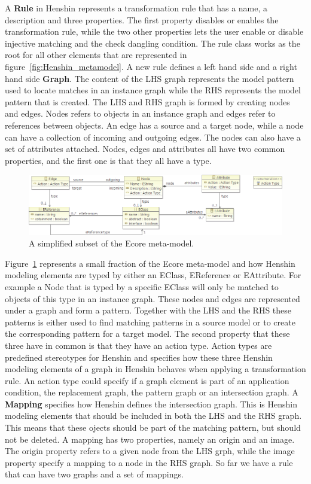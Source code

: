 A \textbf{Rule} in Henshin represents a transformation rule that has a name,
a description and three properties. The first property disables or enables the
transformation rule, while the two other properties lets the user enable or
disable injective matching and the check dangling condition. The rule class
works as the root for all other elements that are represented in 
figure~\ref{fig:Henshin_metamodel}. A new rule defines a left hand side and a
right hand side \textbf{Graph}. The content of the LHS graph represents the
model pattern used to locate matches in an instance graph while the RHS
represents the model pattern that is created. The LHS and RHS graph is formed by
creating nodes and edges. Nodes refers to objects in an instance graph and
edges refer to references between objects. An edge has a source and a target
node, while a node can have a collection of incoming and outgoing edges. The
nodes can also have a set of attributes attached. Nodes, edges and attributes
all have two common properties, and the first one is that they all have a type.

\begin{figure}[H]
	\centering
	\includegraphics[scale=0.60]{./Figures/Node_edge_attribute.png}
	\caption[Henshin relationship with Ecore]
	{A simplified subset of the Ecore meta-model.}
	\label{fig:henshin_ecore}
\end{figure}

Figure~\ref{fig:henshin_ecore} represents a small fraction of the Ecore
meta-model and how Henshin modeling elements are typed by either an EClass,
EReference or EAttribute. For example a Node that is typed by a specific EClass
will only be matched to objects of this type in an instance graph. These nodes
and edges are represented under a graph and form a pattern. Together with the
LHS and the RHS these patterns is either used to find matching patterns in a
source model or to create the corresponding pattern for a target model. The
second property that these three have in common is that they have an action
type. Action types are predefined stereotypes for Henshin and specifies how
these three Henshin modeling elements of a graph in Henshin behaves when
applying a transformation rule. An action type could specify if a graph element
is part of an application condition, the replacement graph, the pattern graph
or an intersection graph. A \textbf{Mapping} specifies how Henshin defines the
intersection graph. This is Henshin modeling elements that should be included
in both the LHS and the RHS graph. This means that these ojects should be part
of the matching pattern, but should not be deleted. A mapping has two
properties, namely an origin and an image. The origin property refers to a
given node from the LHS grph, while the image property specify a mapping to a
node in the RHS graph. So far we have a rule that can have two graphs and a set
of mappings.

